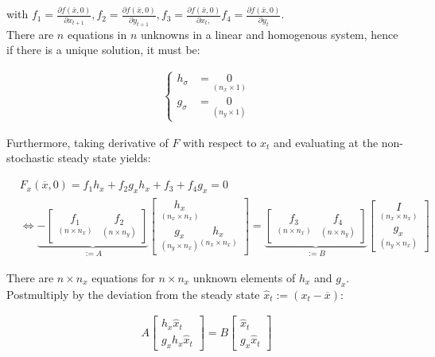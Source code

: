 \documentclass{pracamgr}
\numberwithin{equation}{section}
\begin{document}
with $f_1= \frac{\partial f (\bar{x}, 0)}{\partial x_{t+1}}, f_2=  \frac{\partial f (\bar{x}, 0)}{\partial y_{t+1}},  f_3=\frac{\partial f (\bar{x}, 0)}{\partial x_{t},}  f_4=\frac{\partial f (\bar{x}, 0)}{\partial y_{t}}$. \\

There are $n$ equations in $n$ unknowns in a linear and homogenous system, hence if there is a unique solution, it must be:

\begin{align}
\left\{
\begin{array}{cl}
h_\sigma &= \underset{(n_x\times 1)}{0} \\
g_\sigma &= \underset{(n_y \times 1)}{0} 
\end{array}
\right.
\end{align}

Furthermore, taking derivative of $F$ with respect to $x_t$ and evaluating at the non-stochastic steady state yields:

\begin{eqnarray}
&    F_x (\overline{x},0) = f_1 h_x + f_2 g_x h_x + f_3 + f_4 g_x = 0 \nonumber \\
& \iff \underbrace{- \begin{bmatrix} \underset{(n\times n_x)}{f_1} & \underset{(n\times n_y)}{f_2} \end{bmatrix}}_{:=A} \begin{bmatrix} \underset{(n_x\times n_x)}{h_x} \\ \underset{(n_y\times n_x)}{g_x} \underset{(n_x\times n_x)}{h_x} \end{bmatrix}  = \underbrace{\begin{bmatrix} \underset{(n\times n_x)}{f_3} & \underset{(n\times n_y)}{f_4}\end{bmatrix}}_{:=B} \begin{bmatrix} \underset{(n_x\times n_x)}{I} \\\underset{(n_y\times n_x)}{g_x} \end{bmatrix}
\end{eqnarray}
  
There are $n\times n_x$ equations for $n\times n_x$ unknown elements of $h_x$ and $g_x$. Postmultiply by the deviation from the steady state $\widehat{x}_t := (x_t-\overline{x})$:

 \begin{align}
 A \begin{bmatrix} h_x \widehat{x}_t \\ g_x h_x \widehat{x}_t \end{bmatrix} = B \begin{bmatrix} \widehat{x}_t \\ g_x \widehat{x}_t \end{bmatrix}
  \end{align}
\end{document}
